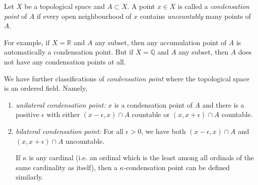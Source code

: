 \documentclass[12pt]{article}
\begin{document}
Let $X$ be a topological space and $A\subset X$. A point $x\in X$ is called a {\em condensation point} of $A$ if every open neighbourhood of $x$ contains \emph{uncountably} many points of $A$.

For example, if $X=\mathbb R$ and $A$ any subset, then any accumulation point of $A$ is automatically a condensation point. But if $X=\mathbb Q$ and $A$ any subset, then $A$ does not have any condensation points at all. 

We have further classifications of {\em condensation point} where the topological space is an ordered field. Namely,
\begin{enumerate}
\item {\em unilateral condensation point:} $x$ is a condensation point of $A$ and there is a positive $\epsilon$ with either $(x-\epsilon,x)\cap A$ countable or $(x,x+\epsilon)\cap A$ countable.
\item {\em bilateral condensation point:} For all $\epsilon>0$, we have both $(x-\epsilon,x)\cap A$ and $(x,x+\epsilon)\cap A$ uncountable.


If $\kappa$ is any cardinal (i.e. an ordinal which is the least among all ordinals of the same cardinality as itself), then a $\kappa$-condensation point can be defined similarly. 
\end{enumerate}

\end{document}
